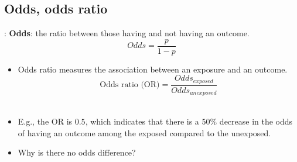 \subsection{Odds, odds ratio}
\begin{frame}{\secname: \subsecname}
	\textbf{Odds}: the ratio between those having and not having an outcome. \[ Odds = \frac{p}{1-p}\]
	
\begin{itemize}
\item<2|handout:2-> Odds ratio measures the association between an exposure and an outcome.
\[\text{Odds ratio (OR)} = \frac{Odds_{exposed}}{Odds_{unexposed}}\] \\  \item<3|handout:3-> E.g., the OR is $0.5$, which indicates that there is a 50\% decrease in the odds of having an outcome among the exposed compared to the unexposed.
\item<4|handout:4> Why is there no odds difference?
\end{itemize}
\end{frame}


